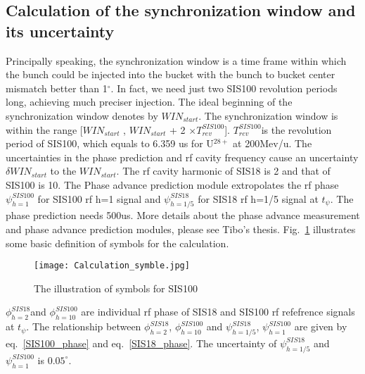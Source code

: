 \subsection{Calculation of the synchronization window and its uncertainty}
Principally speaking, the synchronization window is a time frame within which the bunch could be injected into the bucket with the bunch to bucket center mismatch better than 1$^\circ$. In fact, we need just two SIS100 revolution periods long, achieving much preciser injection. The ideal beginning of the synchronization window denotes by $WIN_{start}$. The synchronization window is within the range [$WIN_{start}$ , $WIN_{start}$  + 2 $\times T_{rev}^{SIS100}$]. $T_{rev}^{SIS100}$is the revolution period of SIS100, which equals to 6.359 us for U$^{28+}$ at 200Mev/u. The uncertainties in the phase prediction and rf cavity frequency cause an uncertainty $\delta WIN_{start}$ to the $WIN_{start}$. The rf cavity harmonic of SIS18 is 2 and that of SIS100 is 10. The Phase advance prediction module extropolates the rf phase $\psi_{h=1}^{SIS100}$ for SIS100 rf h=1 signal and $\psi_{h=1/5}^{SIS18}$ for SIS18 rf h=1/5 signal at $t_{\psi}$. The phase prediction needs 500us. More details about the phase advance measurement and phase advance prediction modules, please see Tibo's thesis. Fig.~\ref{Calculation_symble} illustrates some basic definition of symbols for the calculation. 
\begin{figure}[!htb]
   \centering   
   \texttt{[image: Calculation\_symble.jpg]}
   \caption{The illustration of symbols for SIS100}
   \label{Calculation_symble}
\end{figure}
$\phi_{h=2}^{SIS18}$and $\phi_{h=10}^{SIS100}$ are individual rf phase of SIS18 and SIS100 rf refefrence signals at $t_{\psi}$. The relationship between $\phi_{h=2}^{SIS18}$, $\phi_{h=10}^{SIS100}$ and $\psi_{h=1/5}^{SIS18}$, $\psi_{h=1}^{SIS100}$ are given by eq.~\ref{SIS100_phase} and eq.~\ref{SIS18_phase}. The uncertainty of $\psi_{h=1/5}^{SIS18}$ and $\psi_{h=1}^{SIS100}$ is $0.05^\circ$.

